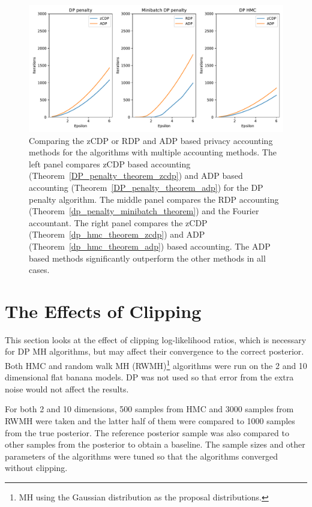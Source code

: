 \documentclass[english,twoside,openright]{HYgraduMLDS}
\begin{document}
\begin{figure}[h]
	\centering
  \includegraphics[width=\textwidth]{figures/accountant_comparison}
  \caption{
    Comparing the zCDP or RDP and ADP based privacy accounting methods
    for the algorithms with multiple accounting methods. The left panel
    compares zCDP based accounting (Theorem~\ref{DP_penalty_theorem_zcdp})
    and ADP based accounting (Theorem~\ref{DP_penalty_theorem_adp}) for
    the DP penalty algorithm. The middle panel compares the RDP accounting
    (Theorem~\ref{dp_penalty_minibatch_theorem}) and the Fourier accountant.
    The right panel compares the zCDP (Theorem~\ref{dp_hmc_theorem_zcdp})
    and ADP (Theorem~\ref{dp_hmc_theorem_adp}) based accounting.
    The ADP based methods significantly outperform the other methods
    in all cases.
  }
  \label{accounting_comparison_fig}
\end{figure}

\section{The Effects of Clipping}\label{clipping_experiments}

This section looks at the effect of clipping log-likelihood ratios,
which is necessary for DP MH algorithms, but may affect their convergence
to the correct posterior.
Both HMC and random walk MH (RWMH)\footnote{MH using the Gaussian
distribution as the proposal distributions.}
algorithms were run on the 2 and 10 dimensional flat banana models.
DP was not used so that error from the extra noise would not affect the results.

For both 2 and 10 dimensions, 500 samples from HMC and 3000 samples from
RWMH were taken and the latter half of them were
compared to 1000 samples from the true posterior. The reference posterior sample
was also compared to other samples from the posterior to obtain a baseline.
The sample sizes and other parameters of the algorithms were tuned so that
the algorithms converged without clipping.
\end{document}
